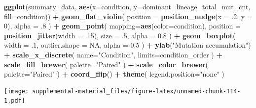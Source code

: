 \documentclass[]{book}
\newenvironment{Shaded}{\begin{snugshade}}{\end{snugshade}}
\newcommand{\DataTypeTok}[1]{\textcolor[rgb]{0.13,0.29,0.53}{#1}}
\newcommand{\DecValTok}[1]{\textcolor[rgb]{0.00,0.00,0.81}{#1}}
\newcommand{\FloatTok}[1]{\textcolor[rgb]{0.00,0.00,0.81}{#1}}
\newcommand{\KeywordTok}[1]{\textcolor[rgb]{0.13,0.29,0.53}{\textbf{#1}}}
\newcommand{\NormalTok}[1]{#1}
\newcommand{\OperatorTok}[1]{\textcolor[rgb]{0.81,0.36,0.00}{\textbf{#1}}}
\newcommand{\OtherTok}[1]{\textcolor[rgb]{0.56,0.35,0.01}{#1}}
\newcommand{\StringTok}[1]{\textcolor[rgb]{0.31,0.60,0.02}{#1}}
\begin{document}
\begin{Shaded}
\begin{Highlighting}[]
\KeywordTok{ggplot}\NormalTok{(summary_data, }\KeywordTok{aes}\NormalTok{(}\DataTypeTok{x=}\NormalTok{condition, }\DataTypeTok{y=}\NormalTok{dominant_lineage_total_mut_cnt, }\DataTypeTok{fill=}\NormalTok{condition)) }\OperatorTok{+}
\StringTok{  }\KeywordTok{geom_flat_violin}\NormalTok{(}
    \DataTypeTok{position =} \KeywordTok{position_nudge}\NormalTok{(}\DataTypeTok{x =} \FloatTok{.2}\NormalTok{, }\DataTypeTok{y =} \DecValTok{0}\NormalTok{),}
    \DataTypeTok{alpha =} \FloatTok{.8}
\NormalTok{  ) }\OperatorTok{+}
\StringTok{  }\KeywordTok{geom_point}\NormalTok{(}
    \DataTypeTok{mapping=}\KeywordTok{aes}\NormalTok{(}\DataTypeTok{color=}\NormalTok{condition),}
    \DataTypeTok{position =} \KeywordTok{position_jitter}\NormalTok{(}\DataTypeTok{width =} \FloatTok{.15}\NormalTok{),}
    \DataTypeTok{size =} \FloatTok{.5}\NormalTok{,}
    \DataTypeTok{alpha =} \FloatTok{0.8}
\NormalTok{  ) }\OperatorTok{+}
\StringTok{  }\KeywordTok{geom_boxplot}\NormalTok{(}
    \DataTypeTok{width =} \FloatTok{.1}\NormalTok{,}
    \DataTypeTok{outlier.shape =} \OtherTok{NA}\NormalTok{,}
    \DataTypeTok{alpha =} \FloatTok{0.5}
\NormalTok{  ) }\OperatorTok{+}
\StringTok{  }\KeywordTok{ylab}\NormalTok{(}\StringTok{"Mutation accumulation"}\NormalTok{) }\OperatorTok{+}
\StringTok{  }\KeywordTok{scale_x_discrete}\NormalTok{(}
    \DataTypeTok{name=}\StringTok{"Condition"}\NormalTok{,}
    \DataTypeTok{limits=}\NormalTok{condition_order}
\NormalTok{  ) }\OperatorTok{+}
\StringTok{  }\KeywordTok{scale_fill_brewer}\NormalTok{(}
    \DataTypeTok{palette=}\StringTok{"Paired"}
\NormalTok{  ) }\OperatorTok{+}
\StringTok{  }\KeywordTok{scale_color_brewer}\NormalTok{(}
    \DataTypeTok{palette=}\StringTok{"Paired"}
\NormalTok{  ) }\OperatorTok{+}
\StringTok{  }\KeywordTok{coord_flip}\NormalTok{() }\OperatorTok{+}
\StringTok{  }\KeywordTok{theme}\NormalTok{(}
    \DataTypeTok{legend.position=}\StringTok{"none"}
\NormalTok{  )}
\end{Highlighting}
\end{Shaded}

\texttt{[image: supplemental-material\_files/figure-latex/unnamed-chunk-114-1.pdf]}

\begin{Shaded}
\end{Shaded}
\end{document}

